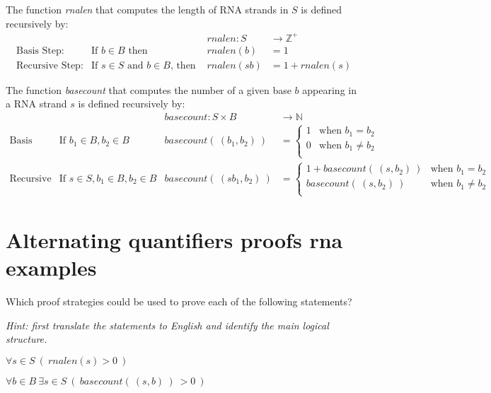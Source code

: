 \documentclass[12pt, oneside]{article}
\begin{document}
The function \textit{rnalen} that computes the length of RNA strands in $S$ is defined recursively by:
\[
\begin{array}{llll}
& & \textit{rnalen} : S & \to \mathbb{Z}^+ \\
\textrm{Basis Step:} & \textrm{If } b \in B\textrm{ then } & \textit{rnalen}(b) & = 1 \\
\textrm{Recursive Step:} & \textrm{If } s \in S\textrm{ and }b \in B\textrm{, then  } & \textit{rnalen}(sb) & = 1 + \textit{rnalen}(s)
\end{array}
\]

The function \textit{basecount} that computes the number of a given base 
$b$ appearing in a RNA strand $s$ is defined recursively by:
\[
\begin{array}{llll}
& & \textit{basecount} : S \times B & \to \mathbb{N} \\
\textrm{Basis Step:} &  \textrm{If } b_1 \in B, b_2 \in B & \textit{basecount}(~(b_1, b_2)~) & =
        \begin{cases}
            1 & \textrm{when } b_1 = b_2 \\
            0 & \textrm{when } b_1 \neq b_2 \\
        \end{cases} \\
\textrm{Recursive Step:} & \textrm{If } s \in S, b_1 \in B, b_2 \in B &\textit{basecount}(~(s b_1, b_2)~) & =
        \begin{cases}
            1 + \textit{basecount}(~(s, b_2)~) & \textrm{when } b_1 = b_2 \\
            \textit{basecount}(~(s, b_2)~) & \textrm{when } b_1 \neq b_2 \\
        \end{cases}
\end{array}
\] \vfill
\section*{Alternating quantifiers proofs rna examples}


Which proof strategies could be used to prove each of the following statements?

{\it Hint: first translate the statements to English and identify the main logical structure.}

$\forall s \in S~(~rnalen(s) > 0~)$

\vspace{100pt}

$\forall b \in B~\exists s \in S~(~basecount(~(s,b)~)~ > 0~)$
\end{document}
